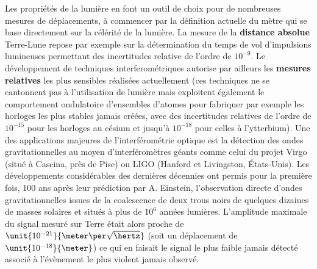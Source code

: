 \documentclass[12pt,a4paper]{article}
\begin{document}
Les propriétés de la lumière en font un outil de choix pour de nombreuses mesures de déplacements, à commencer par la définition actuelle du mètre qui se base directement sur la célérité de la lumière.
La mesure de la \textbf{distance absolue} Terre-Lune repose par exemple sur la détermination du temps de vol d'impulsions lumineuses permettant des incertitudes relative de l'ordre de $10^{-9}$.
Le développement de techniques interferométriques autorise par ailleurs les \textbf{mesures relatives} les plus sensibles réalisées actuellement (ces techniques ne se cantonnent pas à l'utilisation de lumière mais exploitent également le comportement ondulatoire d'ensembles d'atomes pour fabriquer par exemple les horloges les plus stables jamais créées, avec des incertitudes relatives de l'ordre de $10^{-15}$ pour les horloges au césium et jusqu'à $10^{-18}$ pour celles à l'ytterbium).
Une des applications majeures de l'interférométrie optique est la détection des ondes gravitationnelles au moyen d'interféromètres géants comme celui du projet Virgo (situé à Cascina, près de Pise) ou LIGO (Hanford et Livingston, États-Unis).
Les développements considérables des dernières décennies ont permis pour la première fois, 100 ans après leur prédiction par A. Einstein, l'observation directe d'ondes gravitationnelles issues de la coalescence de deux trous noirs de quelques dizaines de masses solaires et situés à plus de $10^6$ années lumières.
L'amplitude maximale du signal mesuré sur Terre était alors proche de $\unit{10^{-21}}{\meter\per\sqrt{\hertz}}$ (soit un déplacement de $\unit{10^{-18}}{\meter}$) ce qui en faisait le signal le plus faible jamais détecté associé à l'évènement le plus violent jamais observé.
\end{document}
